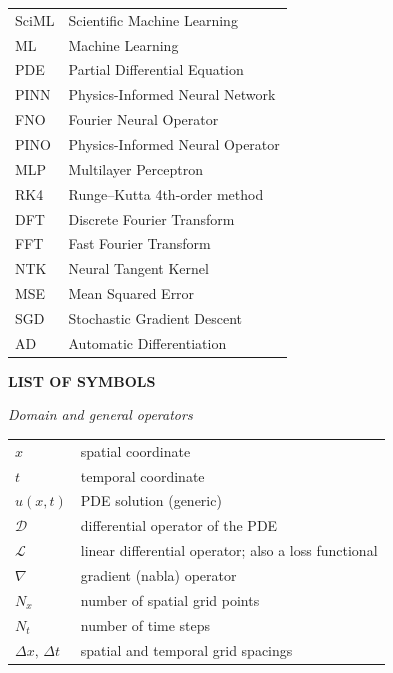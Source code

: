 \vspace{0.5cm}
\noindent
\begin{tabular}{@{}p{2.6cm}p{12cm}@{}}
    SciML & Scientific Machine Learning \\[2pt]
    ML    & Machine Learning \\[2pt]
    PDE   & Partial Differential Equation \\[2pt]
    PINN  & Physics-Informed Neural Network \\[2pt]
    FNO   & Fourier Neural Operator \\[2pt]
    PINO  & Physics-Informed Neural Operator \\[2pt]
    MLP   & Multilayer Perceptron \\[2pt]
    RK4   & Runge--Kutta 4th-order method \\[2pt]
    DFT   & Discrete Fourier Transform \\[2pt]
    FFT   & Fast Fourier Transform \\[2pt]
    NTK   & Neural Tangent Kernel \\[2pt]
    MSE   & Mean Squared Error \\[2pt]
    SGD   & Stochastic Gradient Descent \\[2pt]
    AD    & Automatic Differentiation \\
\end{tabular}

\pagebreak

\begin{center}
\textbf{LIST OF SYMBOLS}
\end{center}

\vspace{0.4cm}
\noindent\textit{Domain and general operators}\\[2pt]
\noindent
\begin{tabular}{@{}p{2.6cm}p{12cm}@{}}
    $x$              & spatial coordinate \\[2pt]
    $t$              & temporal coordinate \\[2pt]
    $u(x,t)$         & PDE solution (generic) \\[2pt]
    $\mathcal{D}$    & differential operator of the PDE \\[2pt]
    $\mathcal{L}$    & linear differential operator; also a loss functional \\[2pt]
    $\nabla$         & gradient (nabla) operator \\[2pt]
    $N_x$            & number of spatial grid points \\[2pt]
    $N_t$            & number of time steps \\[2pt]
    $\Delta x,\,\Delta t$ & spatial and temporal grid spacings \\
\end{tabular}

